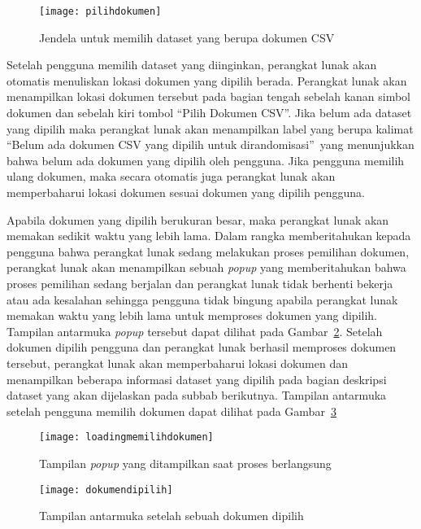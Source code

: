 \begin{figure}
	\centering
	\texttt{[image: pilihdokumen]}
	\caption{Jendela untuk memilih dataset yang berupa dokumen CSV}
	\label{fig:pilihdokumen}
\end{figure}

Setelah pengguna memilih dataset yang diinginkan, perangkat lunak akan otomatis menuliskan lokasi dokumen yang dipilih berada. Perangkat lunak akan menampilkan lokasi dokumen tersebut pada bagian tengah sebelah kanan simbol dokumen dan sebelah kiri tombol \textquotedblleft Pilih Dokumen CSV\textquotedblright. Jika belum ada dataset yang dipilih maka perangkat lunak akan menampilkan label yang berupa kalimat \textquotedblleft Belum ada dokumen CSV yang dipilih untuk dirandomisasi\textquotedblright~yang menunjukkan bahwa belum ada dokumen yang dipilih oleh pengguna. Jika pengguna memilih ulang dokumen, maka secara otomatis juga perangkat lunak akan memperbaharui lokasi dokumen sesuai dokumen yang dipilih pengguna.

Apabila dokumen yang dipilih berukuran besar, maka perangkat lunak akan memakan sedikit waktu yang lebih lama. Dalam rangka memberitahukan kepada pengguna bahwa perangkat lunak sedang melakukan proses pemilihan dokumen, perangkat lunak akan menampilkan sebuah \textit{popup} yang memberitahukan bahwa proses pemilihan sedang berjalan dan perangkat lunak tidak berhenti bekerja atau ada kesalahan sehingga pengguna tidak bingung apabila perangkat lunak memakan waktu yang lebih lama untuk memproses dokumen yang dipilih. Tampilan antarmuka \textit{popup} tersebut dapat dilihat pada Gambar~\ref{fig:loadingmemilihdokumen}. Setelah dokumen dipilih pengguna dan perangkat lunak berhasil memproses dokumen tersebut, perangkat lunak akan memperbaharui lokasi dokumen dan menampilkan beberapa informasi dataset yang dipilih pada bagian deskripsi dataset yang akan dijelaskan pada subbab berikutnya. Tampilan antarmuka setelah pengguna memilih dokumen dapat dilihat pada Gambar~\ref{fig:dokumendipilih}

\begin{figure}
	\centering
	\texttt{[image: loadingmemilihdokumen]}
	\caption{Tampilan \textit{popup} yang ditampilkan saat proses berlangsung}
	\label{fig:loadingmemilihdokumen}
\end{figure}

\begin{figure}
	\centering
	\texttt{[image: dokumendipilih]}
	\caption{Tampilan antarmuka setelah sebuah dokumen dipilih}
	\label{fig:dokumendipilih}
\end{figure}

